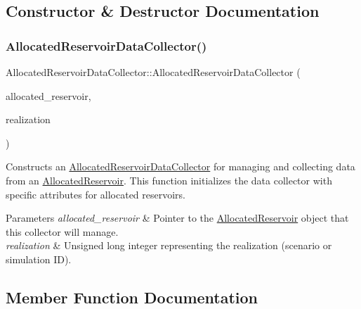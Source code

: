 \subsection{Constructor \& Destructor Documentation}
\mbox{\label{classAllocatedReservoirDataCollector_a512b8604164f43d08f961e0f433678e3}} 
\subsubsection{\texorpdfstring{Allocated\+Reservoir\+Data\+Collector()}{AllocatedReservoirDataCollector()}}
{\footnotesize\ttfamily Allocated\+Reservoir\+Data\+Collector\+::\+Allocated\+Reservoir\+Data\+Collector (\begin{DoxyParamCaption}\item[{\mbox{\hyperlink{classAllocatedReservoir}{Allocated\+Reservoir}} $\ast$}]{allocated\+\_\+reservoir,  }\item[{unsigned long}]{realization }\end{DoxyParamCaption})}



Constructs an \mbox{\hyperlink{classAllocatedReservoirDataCollector}{Allocated\+Reservoir\+Data\+Collector}} for managing and collecting data from an \mbox{\hyperlink{classAllocatedReservoir}{Allocated\+Reservoir}}. This function initializes the data collector with specific attributes for allocated reservoirs. 


\begin{DoxyParams}{Parameters}
{\em allocated\+\_\+reservoir} & Pointer to the \mbox{\hyperlink{classAllocatedReservoir}{Allocated\+Reservoir}} object that this collector will manage. \\
\hline
{\em realization} & Unsigned long integer representing the realization (scenario or simulation ID). \\
\hline
\end{DoxyParams}


\subsection{Member Function Documentation}
\mbox{\label{classAllocatedReservoirDataCollector_a8ef8451d2cc6eb01b205eee75ab93729}} 
